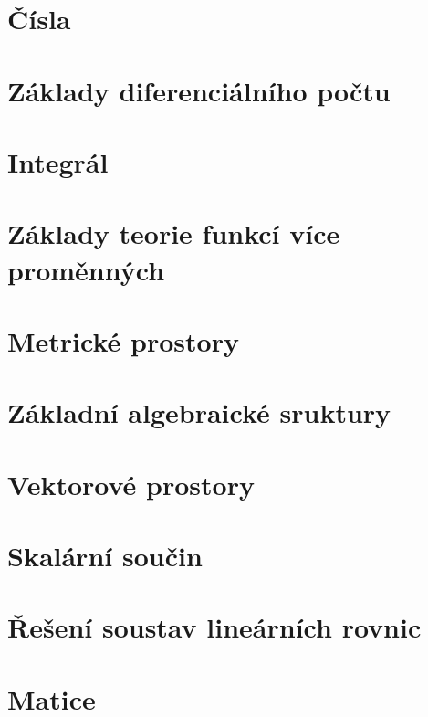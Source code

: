 


\section{Čísla}


\section{Základy diferenciálního počtu}


\section{Integrál}


\section{Základy teorie funkcí více proměnných}


\section{Metrické prostory}


\section{Základní algebraické sruktury}


\section{Vektorové prostory}


\section{Skalární součin}


\section{Řešení soustav lineárních rovnic}


\section{Matice}


